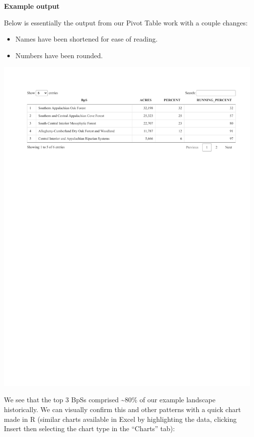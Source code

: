 \documentclass[
]{book}
\providecommand{\tightlist}{%
  \setlength{\itemsep}{0pt}\setlength{\parskip}{0pt}}
\begin{document}
\textbf{Example output}

Below is essentially the output from our Pivot Table work with a couple changes:

\begin{itemize}
\tightlist
\item
  Names have been shortened for ease of reading.
\item
  Numbers have been rounded.
\end{itemize}

\includegraphics{FSCBook_files/figure-latex/bpsDT-1.pdf}

We see that the top 3 BpSs comprised \textasciitilde80\% of our example landscape historically. We can visually confirm this and other patterns with a quick chart made in R (similar charts available in Excel by highlighting the data, clicking Insert then selecting the chart type in the ``Charts'' tab):
\end{document}
